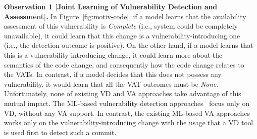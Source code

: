 


\vspace{2pt} {\bf Observation 1 [Joint Learning of Vulnerability
    Detection and Assessment].} In Figure~\ref{fig:motiv-code}, if a
model learns that the availability assessment of this vulnerability is
{\em Complete} (i.e., system could be completely unavailable), it
could learn that this change is a vulnerability-introducing one (i.e.,
the detection outcome is positive). On the other hand, if a model
learns that this is a vulnerability-introducing change, it could learn
more about the semantics of the code change, and consequently how the
code change relates to the VATs. In contrast, if a model decides that
this does not possess any vulnerability, it would learn that all the
VAT outcomes must be {\em None}. Unfortunately, none of existing VD
and VA approaches take advantage of this mutual impact. The ML-based
vulnerability detection
approaches~\cite{perl2015vccfinder,zhou2017automated,chen2019large}
focus only on VD, without any VA support. In contrast, the
existing ML-based VA approaches~\cite{deepCVA-ase21} works
only on the vulnerability-introducing change with the usage that a VD
tool is used first to detect such a commit.

